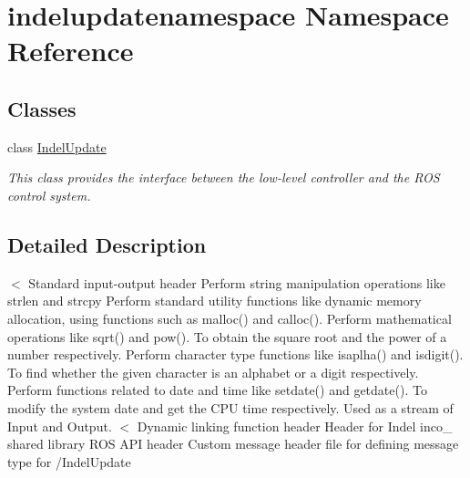 \hypertarget{namespaceindelupdatenamespace}{}\section{indelupdatenamespace Namespace Reference}
\label{namespaceindelupdatenamespace}
\subsection*{Classes}
\begin{DoxyCompactItemize}
\item 
class \hyperlink{classindelupdatenamespace_1_1IndelUpdate}{Indel\+Update}
\begin{DoxyCompactList}\small\item\em This class provides the interface between the low-\/level controller and the R\+OS control system. \end{DoxyCompactList}\end{DoxyCompactItemize}


\subsection{Detailed Description}
$<$ Standard input-\/output header Perform string manipulation operations like strlen and strcpy Perform standard utility functions like dynamic memory allocation, using functions such as malloc() and calloc(). Perform mathematical operations like sqrt() and pow(). To obtain the square root and the power of a number respectively. Perform character type functions like isaplha() and isdigit(). To find whether the given character is an alphabet or a digit respectively. Perform functions related to date and time like setdate() and getdate(). To modify the system date and get the C\+PU time respectively. Used as a stream of Input and Output. $<$ Dynamic linking function header Header for Indel inco\+\_ shared library R\+OS A\+PI header Custom message header file for defining message type for /\+Indel\+Update 